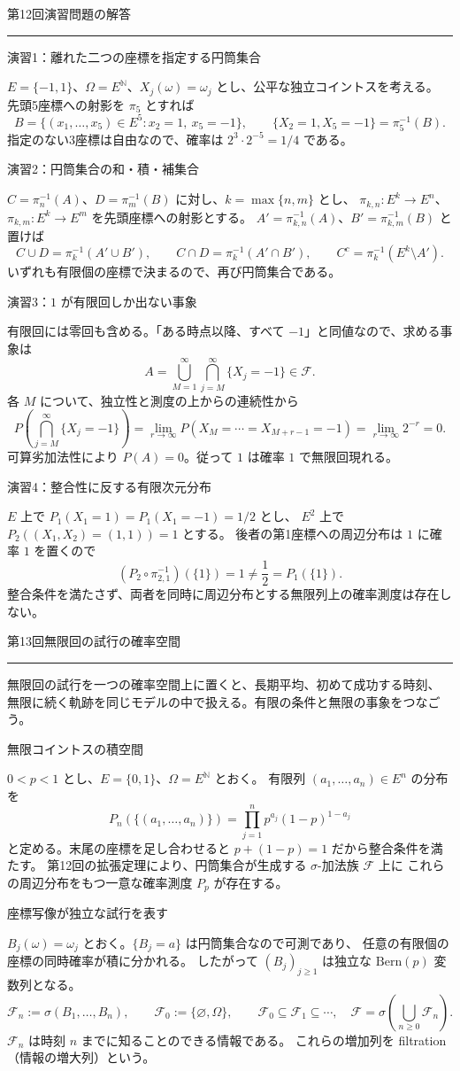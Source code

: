 \documentclass[a4paper,10pt,pdflatex,ja=standard,jafont=ipaex-type1,
  magstyle=real,scale=1]{bxjsarticle}
\newcommand{\coursename}{確率論と統計学 I}
\newcommand{\topic}[1]{\par\vspace{5pt}
  {\large\sffamily\mdseries\color{accent}#1}\par\vspace{2pt}}
\newcommand{\handouttitle}[1]{%
  \begin{center}
    {\Large\color{ink}#1}\par\vspace{3mm}
    {\color{accent}\rule{0.88\linewidth}{0.7pt}}
  \end{center}\vspace{-2mm}}
\newcommand{\keybox}[1]{\par\vspace{3pt}\begingroup
  \setlength{\fboxsep}{5pt}
  \colorbox{soft}{\parbox{\dimexpr\linewidth-2\fboxsep\relax}{#1}}%
  \endgroup\par\vspace{2pt}}
\newcommand{\F}{\mathcal F}
\newcommand{\N}{\mathbb N}
\begin{document}
\fontsize{10pt}{13.5pt}\selectfont
\begingroup
\fancyhead[L]{\small\color{ink}\coursename{}・前回の演習解答}
\handouttitle{第12回\quad 演習問題の解答}

\topic{演習1：離れた二つの座標を指定する円筒集合}
$E=\{-1,1\}$、$\Omega=E^\N$、$X_j(\omega)=\omega_j$ とし、公平な独立コイントスを考える。
先頭5座標への射影を $\pi_5$ とすれば
$$
  B=\{(x_1,\ldots,x_5)\in E^5:x_2=1,\ x_5=-1\},\qquad
  \{X_2=1,X_5=-1\}=\pi_5^{-1}(B).
$$
指定のない3座標は自由なので、確率は $2^3\cdot2^{-5}=1/4$ である。

\topic{演習2：円筒集合の和・積・補集合}
$C=\pi_n^{-1}(A)$、$D=\pi_m^{-1}(B)$ に対し、$k=\max\{n,m\}$ とし、
$\pi_{k,n}:E^k\to E^n$、$\pi_{k,m}:E^k\to E^m$ を先頭座標への射影とする。
$A'=\pi_{k,n}^{-1}(A)$、$B'=\pi_{k,m}^{-1}(B)$ と置けば
$$
  C\cup D=\pi_k^{-1}(A'\cup B'),\qquad
  C\cap D=\pi_k^{-1}(A'\cap B'),\qquad
  C^c=\pi_k^{-1}(E^k\setminus A').
$$
いずれも有限個の座標で決まるので、再び円筒集合である。

\topic{演習3：$1$ が有限回しか出ない事象}
有限回には零回も含める。「ある時点以降、すべて $-1$」と同値なので、求める事象は
$$A=\bigcup_{M=1}^\infty\bigcap_{j=M}^\infty\{X_j=-1\}\in\F.$$
各 $M$ について、独立性と測度の上からの連続性から
$$
  P\left(\bigcap_{j=M}^\infty\{X_j=-1\}\right)
    =\lim_{r\to\infty}P(X_M=\cdots=X_{M+r-1}=-1)
    =\lim_{r\to\infty}2^{-r}=0.
$$
可算劣加法性により $P(A)=0$。従って $1$ は確率 $1$ で無限回現れる。

\topic{演習4：整合性に反する有限次元分布}
$E$ 上で $P_1(X_1=1)=P_1(X_1=-1)=1/2$ とし、
$E^2$ 上で $P_2((X_1,X_2)=(1,1))=1$ とする。
後者の第1座標への周辺分布は $1$ に確率 $1$ を置くので
$$
  (P_2\circ\pi_{2,1}^{-1})(\{1\})=1\ne\frac12=P_1(\{1\}).
$$
整合条件を満たさず、両者を同時に周辺分布とする無限列上の確率測度は存在しない。
\clearpage
\endgroup

\handouttitle{第13回\quad 無限回の試行の確率空間}
\keybox{無限回の試行を一つの確率空間上に置くと、長期平均、初めて成功する時刻、
無限に続く軌跡を同じモデルの中で扱える。有限の条件と無限の事象をつなごう。}

\topic{無限コイントスの積空間}
$0<p<1$ とし、$E=\{0,1\}$、$\Omega=E^\N$ とおく。
有限列 $(a_1,\ldots,a_n)\in E^n$ の分布を
$$P_n(\{(a_1,\ldots,a_n)\})
 =\prod_{j=1}^n p^{a_j}(1-p)^{1-a_j}$$
と定める。末尾の座標を足し合わせると $p+(1-p)=1$ だから整合条件を満たす。
第12回の拡張定理により、円筒集合が生成する $\sigma$-加法族 $\F$ 上に
これらの周辺分布をもつ一意な確率測度 $P_p$ が存在する。

\topic{座標写像が独立な試行を表す}
$B_j(\omega)=\omega_j$ とおく。$\{B_j=a\}$ は円筒集合なので可測であり、
任意の有限個の座標の同時確率が積に分かれる。
したがって $(B_j)_{j\ge1}$ は独立な $\mathrm{Bern}(p)$ 変数列となる。
$$\F_n:=\sigma(B_1,\ldots,B_n),\qquad
 \F_0:=\{\varnothing,\Omega\},\qquad
 \F_0\subseteq\F_1\subseteq\cdots,\quad
 \F=\sigma\left(\bigcup_{n\ge0}\F_n\right).$$
$\F_n$ は時刻 $n$ までに知ることのできる情報である。
これらの増加列を filtration（情報の増大列）という。
\end{document}

